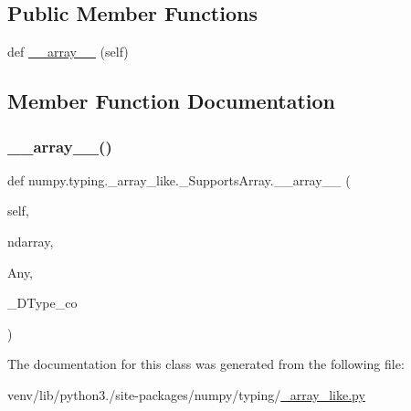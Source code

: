 \subsection*{Public Member Functions}
\begin{DoxyCompactItemize}
\item 
def \hyperlink{classnumpy_1_1typing_1_1__array__like_1_1__SupportsArray_a1723258bb3658ca56c7befe19b47f961}{\+\_\+\+\_\+array\+\_\+\+\_\+} (self)
\end{DoxyCompactItemize}


\subsection{Member Function Documentation}
\mbox{\label{classnumpy_1_1typing_1_1__array__like_1_1__SupportsArray_a1723258bb3658ca56c7befe19b47f961}} 
\subsubsection{\texorpdfstring{\+\_\+\+\_\+array\+\_\+\+\_\+()}{\_\_array\_\_()}}
{\footnotesize\ttfamily def numpy.\+typing.\+\_\+array\+\_\+like.\+\_\+\+Supports\+Array.\+\_\+\+\_\+array\+\_\+\+\_\+ (\begin{DoxyParamCaption}\item[{}]{self,  }\item[{}]{ndarray,  }\item[{}]{Any,  }\item[{}]{\+\_\+\+D\+Type\+\_\+co }\end{DoxyParamCaption})}



The documentation for this class was generated from the following file\+:\begin{DoxyCompactItemize}
\item 
venv/lib/python3./site-\/packages/numpy/typing/\hyperlink{__array__like_8py}{\+\_\+array\+\_\+like.\+py}\end{DoxyCompactItemize}
